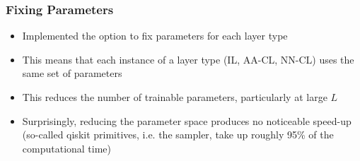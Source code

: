 \documentclass{beamer}
\begin{document}
\begin{frame}
\frametitle{Fixing Parameters}
\begin{itemize}
\item Implemented the option to \alert{fix parameters for each layer type}
\item This means that each instance of a layer type (IL, AA-CL, NN-CL) uses the same set of parameters 
\item This \alert{reduces the number of trainable parameters}, particularly at large $L$
\item Surprisingly, reducing the parameter space \alert{produces no noticeable speed-up} (so-called qiskit primitives, i.e. the sampler, take up roughly 95\% of the computational time)
\end{itemize}
\end{frame}
\end{document}
